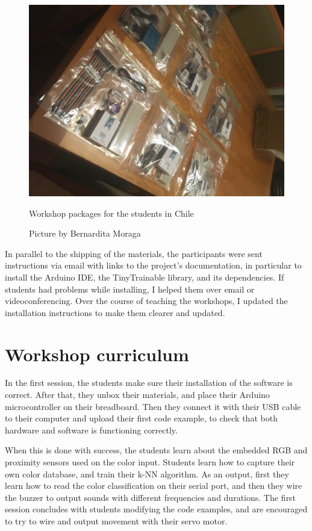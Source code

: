 \begin{figure}[ht]
  \centering
  \includegraphics[width=0.75\linewidth,height=0.25\textheight,keepaspectratio]{images/workshop-packages-chile.jpg}
  \caption{Workshop packages for the students in Chile}
  \caption*{Picture by Bernardita Moraga}
  \label{fig:workshop-packages-chile}
\end{figure}

In parallel to the shipping of the materials, the participants were sent instructions via email with links to the project's documentation, in particular to install the Arduino \acrshort{IDE}, the TinyTrainable library, and its dependencies. If students had problems while installing, I helped them over email or videoconferencing. Over the course of teaching the workshops, I updated the installation instructions to make them clearer and updated.

\section{Workshop curriculum}

In the first session, the students make sure their installation of the software is correct. After that, they unbox their materials, and place their Arduino microcontroller on their breadboard. Then they connect it with their USB cable to their computer and upload their first code example, to check that both hardware and software is functioning correctly.

When this is done with success, the students learn about the embedded RGB and proximity sensors used on the color input. Students learn how to capture their own color database, and train their \acrshort{k-NN} algorithm. As an output, first they learn how to read the color classification on their serial port, and then they wire the buzzer to output sounds with different frequencies and durations. The first session concludes with students modifying the code examples, and are encouraged to try to wire and output movement with their servo motor.

